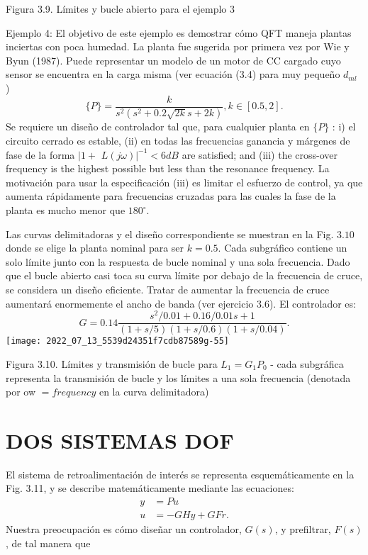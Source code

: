 Figura 3.9. Límites y bucle abierto para el ejemplo 3

Ejemplo 4: El objetivo de este ejemplo es demostrar cómo QFT maneja plantas inciertas con poca humedad. La planta fue sugerida por primera vez por Wie y Byun (1987). Puede representar un modelo de un motor de CC cargado cuyo sensor se encuentra en la carga misma (ver ecuación (3.4) para muy pequeño $d_{m l}$ )
$$
\{P\}=\frac{k}{s^{2}\left(s^{2}+0.2 \sqrt{2 k} s+2 k\right)}, k \in[0.5,2] .
$$
Se requiere un diseño de controlador tal que, para cualquier planta en $\{P\}$ : i) el circuito cerrado es estable, (ii) en todas las frecuencias ganancia y márgenes de fase de la forma $\mid 1+$ $\left. L(j \omega)\right|^{-1}<6 d B$ are satisfied; and (iii) the cross-over frequency is the highest possible but less than the resonance frequency. La motivación para usar la especificación (iii) es limitar el esfuerzo de control, ya que aumenta rápidamente para frecuencias cruzadas para las cuales la fase de la planta es mucho menor que $ 180^{\circ}$.

Las curvas delimitadoras y el diseño correspondiente se muestran en la Fig. $3.10$ donde se elige la planta nominal para ser $k=0.5$. Cada subgráfico contiene un solo límite junto con la respuesta de bucle nominal y una sola frecuencia. Dado que el bucle abierto casi toca su curva límite por debajo de la frecuencia de cruce, se considera un diseño eficiente. Tratar de aumentar la frecuencia de cruce aumentará enormemente el ancho de banda (ver ejercicio 3.6). El controlador es:
$$
G=0.14 \frac{s^{2} / 0.01+0.16 / 0.01 s+1}{(1+s / 5)(1+s / 0.6)(1+s / 0.04)} .
$$
\texttt{[image: 2022\_07\_13\_5539d24351f7cdb87589g-55]}

Figura 3.10. Límites y transmisión de bucle para $L_{1}=G_{1} P_{0}$ - cada subgráfica representa la transmisión de bucle y los límites a una sola frecuencia (denotada por ow $=f r e q u e n c y$ en la curva delimitadora)

\section{DOS SISTEMAS DOF}
El sistema de retroalimentación de interés se representa esquemáticamente en la Fig. 3.11, y se describe matemáticamente mediante las ecuaciones:
$$
\begin{aligned}
y &=P u \\
u &=-G H y+G F r .
\end{aligned}
$$
Nuestra preocupación es cómo diseñar un controlador, $G(s)$, y prefiltrar, $F(s)$, de tal manera que

